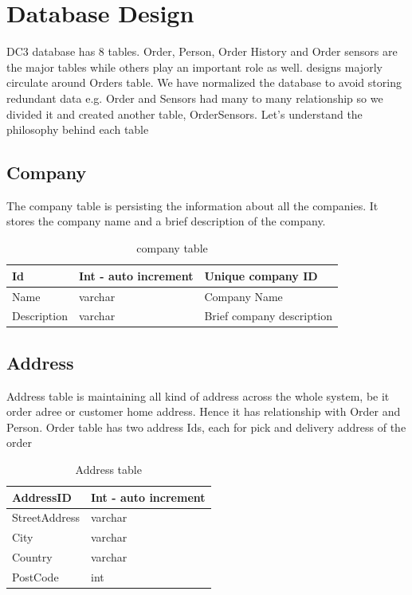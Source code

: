 \section{Database Design}
DC3 database has 8 tables. Order, Person, Order History and Order sensors are the major tables while others play an important role as well.  designs majorly circulate around Orders table. We have normalized the database to avoid storing redundant data e.g. Order and Sensors had many to many relationship so we divided it and created another table, OrderSensors. Let’s understand the philosophy behind each table


\subsection{Company}
The company table is persisting the information about all the companies. It stores the company name and a brief description of the company. 

\begin{table}[!ht]
	\centering
	\begin{tabular}{ |l|l|l| }
		\hline
		Id & Int - auto increment & Unique company ID \\
		\hline
		Name & varchar & Company Name \\
		\hline
		Description & varchar & Brief company description \\
		\hline
	\end{tabular}
	\caption{company table}
\end{table}



\subsection{Address}
Address table is maintaining all kind of address across the whole system, be it order adree or customer home address. Hence it has relationship with Order and Person. Order table has two address Ids, each for pick and delivery address of the order



\begin{table}[!ht]
	\centering
	\begin{tabular}{ |l|l| }
		\hline
		AddressID & Int - auto increment & \\
		\hline
		StreetAddress  & varchar  & \\
		\hline
		City  & varchar &\\
		\hline
		Country  & varchar &\\
		\hline
		PostCode  & int &\\
		\hline
	\end{tabular}
	\caption{Address table}
\end{table}



